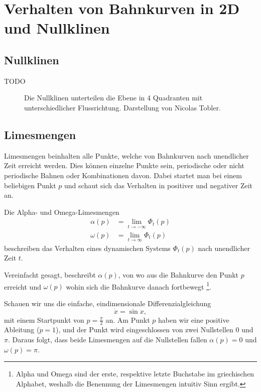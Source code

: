 \section{Verhalten von Bahnkurven in 2D und Nullklinen} \label{poinbendix:section:nullklinen}

\subsection{Nullklinen} \label{poinbendix:subsection:nullklinen}
TODO


\begin{figure} %
    \centering
    
    \caption{Die Nullklinen unterteilen die Ebene in 4 Quadranten mit unterschiedlicher Flussrichtung. Darstellung von Nicolas Tobler.}
    \label{poinbendix:fig:nullklinen}
\end{figure}

\subsection{Limesmengen} \label{poinbendix:subsection:limesmengen}

Limesmengen beinhalten alle Punkte, welche von Bahnkurven nach unendlicher Zeit erreicht werden.
Dies können einzelne Punkte sein, periodische oder nicht periodische Bahnen oder Kombinationen davon.
Dabei startet man bei einem beliebigen Punkt $p$ und schaut sich das Verhalten in positiver und negativer Zeit an.

\begin{definition}[Limesmengen]
Die Alpha- und Omega-Limesmengen
\label{poinbendix:def:limesmengen}
\begin{align*}
    \alpha(p) &= \lim_{t\to-\infty} \Phi_t(p) \\
    \omega(p) &= \lim_{t\to\infty} \Phi_t(p)
\end{align*}
beschreiben das Verhalten eines dynamischen Systems $\Phi_t(p)$ nach unendlicher Zeit $t$.
\end{definition}

Vereinfacht gesagt, beschreibt $\alpha(p)$, von wo aus die Bahnkurve den Punkt $p$ erreicht und $\omega(p)$ wohin sich die Bahnkurve danach fortbewegt
\footnote{Alpha und Omega sind der erste, respektive letzte Buchstabe im griechischen Alphabet, weshalb die Benennung der Limesmengen intuitiv Sinn ergibt.}.

\begin{beispiel} \label{poinbendix:beispiel:1dlimesmengen}
Schauen wir uns die einfache, eindimensionale Differenzialgleichung
\begin{equation*}
    \dot{x} = \sin x,
\end{equation*}
mit einem Startpunkt von $p = \frac{\pi}{2}$ an.
Am Punkt $p$ haben wir eine positive Ableitung ($\dot{p} = 1$), und der Punkt wird eingeschlossen von zwei Nullstellen $0$ und $\pi$.
Daraus folgt, dass beide Limesmengen auf die Nullstellen fallen $\alpha(p) = 0$ und $\omega(p) = \pi$.
\end{beispiel}
